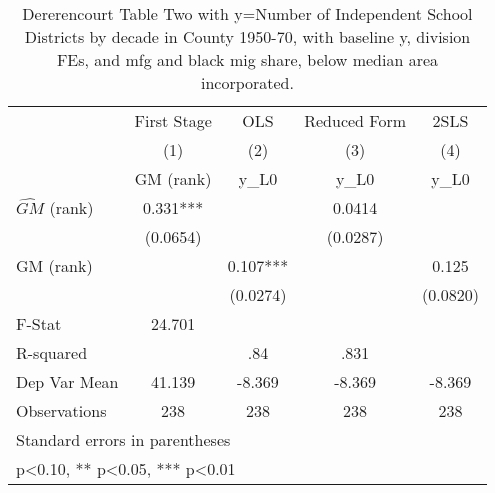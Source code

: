 \begin{table}[htbp]\centering
\def\sym#1{\ifmmode^{#1}\else\(^{#1}\)\fi}
\caption{Dererencourt Table Two with y=Number of Independent School Districts by decade in County 1950-70, with baseline y, division FEs, and mfg and black mig share, below median area incorporated.}
\begin{tabular}{l*{4}{c}}
\toprule
                    & First Stage   &         OLS   &Reduced Form   &        2SLS   \\
                    &\multicolumn{1}{c}{(1)}&\multicolumn{1}{c}{(2)}&\multicolumn{1}{c}{(3)}&\multicolumn{1}{c}{(4)}\\
                    &\multicolumn{1}{c}{GM  (rank)}&\multicolumn{1}{c}{y\_L0}&\multicolumn{1}{c}{y\_L0}&\multicolumn{1}{c}{y\_L0}\\
\midrule
$\hat{GM}$ (rank)   &       0.331***&               &      0.0414   &               \\
                    &    (0.0654)   &               &    (0.0287)   &               \\
\addlinespace
GM  (rank)          &               &       0.107***&               &       0.125   \\
                    &               &    (0.0274)   &               &    (0.0820)   \\
\midrule
F-Stat              &      24.701   &               &               &               \\
R-squared           &               &         .84   &        .831   &               \\
Dep Var Mean        &      41.139   &      -8.369   &      -8.369   &      -8.369   \\
Observations        &         238   &         238   &         238   &         238   \\
\bottomrule
\multicolumn{5}{l}{\footnotesize Standard errors in parentheses}\\
\multicolumn{5}{l}{\footnotesize * p<0.10, ** p<0.05, *** p<0.01}\\
\end{tabular}
\end{table}
